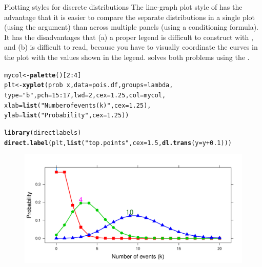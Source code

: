 \documentclass[11pt]{book}\usepackage[]{graphicx}\usepackage[]{color}
\makeatletter
\newcommand{\hlnum}[1]{\textcolor[rgb]{0.686,0.059,0.569}{#1}}%
\newcommand{\hlstr}[1]{\textcolor[rgb]{0.192,0.494,0.8}{#1}}%
\newcommand{\hlopt}[1]{\textcolor[rgb]{0,0,0}{#1}}%
\newcommand{\hlstd}[1]{\textcolor[rgb]{0.345,0.345,0.345}{#1}}%
\newcommand{\hlkwb}[1]{\textcolor[rgb]{0.69,0.353,0.396}{#1}}%
\newcommand{\hlkwc}[1]{\textcolor[rgb]{0.333,0.667,0.333}{#1}}%
\newcommand{\hlkwd}[1]{\textcolor[rgb]{0.737,0.353,0.396}{\textbf{#1}}}%
\newenvironment{kframe}{%
 \def\at@end@of@kframe{}%
 \ifinner\ifhmode%
  \def\at@end@of@kframe{\end{minipage}}%
  \begin{minipage}{\columnwidth}%
 \fi\fi%
 \def\FrameCommand##1{\hskip\@totalleftmargin \hskip-\fboxsep
 \colorbox{shadecolor}{##1}\hskip-\fboxsep
     \hskip-\linewidth \hskip-\@totalleftmargin \hskip\columnwidth}%
 \MakeFramed {\advance\hsize-\width
   \@totalleftmargin\z@ \linewidth\hsize
   \@setminipage}}%
 {\par\unskip\endMakeFramed%
 \at@end@of@kframe}
\newenvironment{knitrout}{}{} %
\renewenvironment{knitrout}{\small\renewcommand{\baselinestretch}{.85}}{} %
\makeatother
\begin{document}
\begin{Example}{Plotting styles for discrete distributions}
The line-graph plot style of  has the advantage that
it is easier to compare the separate distributions in a single plot 
(using the  argument) than
across multiple panels (using a conditioning formula). 
It has the disadvantages that (a) a proper legend is
difficult to construct with , and (b) is difficult to read, because
you have to visually coordinate the curves in the plot with the values shown
in the legend.   solves both problems using
the .
\begin{knitrout}
\color{fgcolor}\begin{kframe}
\begin{alltt}
\hlstd{mycol} \hlkwb{<-} \hlkwd{palette}\hlstd{()[}\hlnum{2}\hlopt{:}\hlnum{4}\hlstd{]}
\hlstd{plt} \hlkwb{<-} \hlkwd{xyplot}\hlstd{( prob} \hlopt{~} \hlstd{x,} \hlkwc{data}\hlstd{=pois.df,} \hlkwc{groups}\hlstd{=lambda,}
  \hlkwc{type}\hlstd{=}\hlstr{"b"}\hlstd{,} \hlkwc{pch}\hlstd{=}\hlnum{15}\hlopt{:}\hlnum{17}\hlstd{,} \hlkwc{lwd}\hlstd{=}\hlnum{2}\hlstd{,} \hlkwc{cex}\hlstd{=}\hlnum{1.25}\hlstd{,} \hlkwc{col}\hlstd{=mycol,}
  \hlkwc{xlab}\hlstd{=}\hlkwd{list}\hlstd{(}\hlstr{"Number of events (k)"}\hlstd{,} \hlkwc{cex}\hlstd{=}\hlnum{1.25}\hlstd{),}
        \hlkwc{ylab}\hlstd{=}\hlkwd{list}\hlstd{(}\hlstr{"Probability"}\hlstd{,}  \hlkwc{cex}\hlstd{=}\hlnum{1.25}\hlstd{))}

\hlkwd{library}\hlstd{(directlabels)}
\hlkwd{direct.label}\hlstd{(plt,} \hlkwd{list}\hlstd{(}\hlstr{"top.points"}\hlstd{,} \hlkwc{cex}\hlstd{=}\hlnum{1.5}\hlstd{,} \hlkwd{dl.trans}\hlstd{(}\hlkwc{y}\hlstd{=y}\hlopt{+}\hlnum{0.1}\hlstd{)))}
\end{alltt}
\end{kframe}\begin{figure}[htbp]


\centerline{\includegraphics[width=.8\textwidth]{ch03/fig/dpois-xyplot2} }


\end{figure}
\end{knitrout}
\end{Example}
\end{document}
